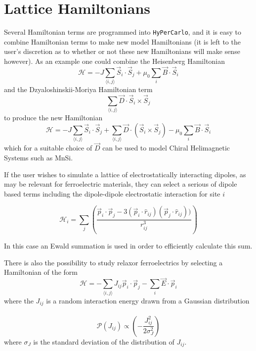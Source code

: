 \documentclass[aps,prb,twocolumn,showpacs,superscriptaddress,floatfix]{revtex4-1}
\begin{document}
\section{Lattice Hamiltonians}
Several Hamiltonian terms are programmed into {\tt HyPerCarlo}, and it is easy to combine Hamiltonian terms to make new model Hamiltonians (it is left to the user's discretion as to whether or not these new Hamiltonians will make sense however). As an example one could combine the Heisenberg Hamiltonian
\begin{equation}
\mathcal{H} = -J\sum_{\langle i,j\rangle} \vec{S}_i \cdot \vec{S}_j +  \mu_0\sum_i\vec{B}\cdot\vec{S}_i
\end{equation}
and the Dzyaloshinskii-Moriya Hamiltonian term 
\begin{equation}
\sum_{\langle i,j \rangle} \vec{D}\cdot\vec{S}_i \times \vec{S}_j
\end{equation}
to produce the new Hamiltonian
\begin{equation}
\mathcal{H} = -J\sum_{\langle i,j\rangle} \vec{S}_i \cdot \vec{S}_j + \sum_{\langle i,j \rangle} \vec{D}\cdot (\vec{S}_i \times \vec{S}_j) - \mu_0\sum_i\vec{B}\cdot\vec{S}_i
\end{equation}
which for a suitable choice of $\vec{D}$ can be used to model Chiral Helimagnetic Systems such as MnSi.

If the user wishes to simulate a lattice of electrostatically interacting dipoles, as may be relevant for ferroelectric materials, they can select a serious of dipole based terms including the dipole-dipole electrostatic interaction for site $i$

\begin{equation}
\mathcal{H}_i = \sum_j \left( \frac{ \vec{p}_i\cdot\vec{p}_j-3 (\vec{p}_i\cdot\hat{r}_{ij}) (\vec{p}_j\cdot\hat{r}_{ij}))}{ r_{ij}^3} \right)
\end{equation}

In this case an Ewald summation is used in order to efficiently calculate this sum.

There is also the possibility to study relaxor ferroelectrics by selecting a Hamiltonian of the form
\begin{equation}
\mathcal{H} = -\sum_{\langle i,j\rangle} J_{ij} \vec{p}_i \cdot \vec{p}_j - \sum_i\vec{E}\cdot\vec{p}_i
\end{equation}
where the $J_{ij}$ is a random interaction energy drawn from a Gaussian distribution ~\cite{Lao}
\begin{equation}
\mathcal{P}(J_{ij}) \propto \left( -\frac{J_{ij}^2}{2\sigma_{J}^2} \right)
\end{equation}
where $\sigma_J$ is the standard deviation of the distribution of $J_{ij}$.
\end{document}
